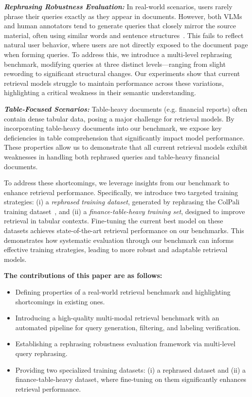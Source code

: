 \emph{\textbf{Rephrasing Robustness Evaluation:}} In real-world scenarios, users rarely phrase their queries exactly as they appear in documents. However, both VLMs and human annotators tend to generate queries that closely mirror the source material, often using similar words and sentence structures~\citep{smeaton1998user,zhu2024enhancing}. This fails to reflect natural user behavior, where users are not directly exposed to the document page when forming queries.
To address this, we introduce a multi-level rephrasing benchmark, modifying queries at three distinct levels—ranging from slight rewording to significant structural changes. Our experiments show that current retrieval models struggle to maintain performance across these variations, highlighting a critical weakness in their semantic understanding.

\emph{\textbf{Table-Focused Scenarios:}} Table-heavy documents (e.g. financial reports) often contain dense tabular data, posing a major challenge for retrieval models. By incorporating table-heavy documents into our benchmark, we expose key deficiencies in table comprehension that significantly impact model performance.
These properties allow us to demonstrate that all current retrieval models exhibit weaknesses in handling both rephrased queries and table-heavy financial documents. 

\noindent
To address these shortcomings, we leverage insights from our benchmark to enhance retrieval performance. Specifically, we introduce two targeted training strategies: (i) a \emph{rephrased training dataset}, generated by rephrasing the ColPali training dataset~\citep{faysse2024colpali}, and (ii) a \emph{finance-table-heavy training set}, designed to improve retrieval in tabular contexts. Fine-tuning the current best model on these datasets achieves state-of-the-art retrieval performance on our benchmarks. This demonstrates how systematic evaluation through our benchmark can informs effective training strategies, leading to more robust and adaptable retrieval models.

\vspace{0.23cm}
\noindent
\textbf{The contributions of this paper are as follows:}
\vspace{-0.2cm}
\begin{itemize}[leftmargin=*] 
    \setlength{\itemsep}{3pt}
    \setlength{\parskip}{0pt}
    \setlength{\itemindent}{1pt} %
    \item Defining properties of a real-world retrieval benchmark and highlighting shortcomings in existing ones.
    \item Introducing a high-quality multi-modal retrieval benchmark with an automated pipeline for query generation, filtering, and labeling verification.
    \item Establishing a rephrasing robustness evaluation framework via multi-level query rephrasing.
    \item Providing two specialized training datasets: (i) a rephrased dataset and (ii) a finance-table-heavy dataset, where fine-tuning on them significantly enhances retrieval performance.
\end{itemize}




